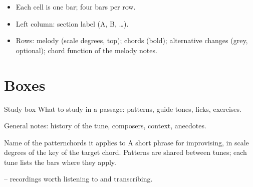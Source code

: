 \medskip
\begin{itemize}
\item Each cell is one bar; four bars per row.
\item Left column: section label (A, B, \ldots).
\item Rows: melody (scale degrees, top); chords (bold); alternative changes (grey, optional); chord function of the melody notes.
\end{itemize}

\section*{Boxes}
\begin{study}{Study box}
What to study in a passage: patterns, guide tones, licks, exercises.
\end{study}

\begin{notes}
General notes: history of the tune, composers, context, anecdotes.
\end{notes}

\begin{patternbox}{Name of the pattern}{chords it applies to}
A short phrase for improvising, in scale degrees of the key of the target chord.
Patterns are shared between tunes; each tune lists the bars where they apply.
\end{patternbox}

\begin{recordings}
 -- recordings worth listening to and transcribing.
\end{recordings}
